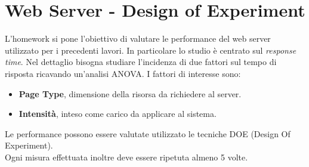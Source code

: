 \chapter{Web Server - Design of Experiment}
L'homework si pone l'obiettivo di valutare le performance del web server utilizzato per i precedenti lavori. In particolare lo studio è centrato sul \textit{response time}. Nel dettaglio bisogna studiare l'incidenza di due fattori sul tempo di risposta ricavando un'analisi ANOVA. I fattori di interesse sono:
\begin{itemize}
	\item \textbf{Page Type}, dimensione della risorsa da richiedere al server.
	\item \textbf{Intensità}, inteso come carico da applicare al sistema. 
\end{itemize}
Le performance possono essere valutate utilizzato le tecniche DOE (Design Of Experiment). 
\\Ogni misura effettuata inoltre deve essere ripetuta almeno 5 volte.

